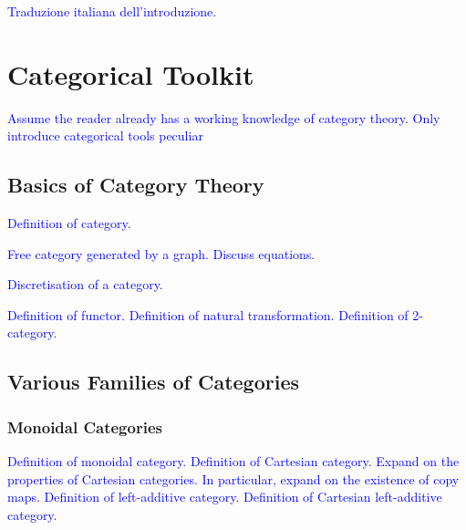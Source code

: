 \documentclass[11pt,a4paper,openright,twoside]{report}
\theoremstyle{plain}
\theoremstyle{definition}
\begin{document}
  \textcolor{blue}{Traduzione italiana dell'introduzione.}


\clearpage{\pagestyle{empty}\cleardoublepage}



\tableofcontents
\rhead[\fancyplain{}{\bfseries\leftmark}]{\fancyplain{}{\bfseries\thepage}} 
\clearpage{\pagestyle{empty}\cleardoublepage}





\chapter{Categorical Toolkit}
\lhead[\fancyplain{}{\bfseries\thepage}]{\fancyplain{}{\bfseries\rightmark}}



\textcolor{blue}{Assume the reader already has a working knowledge of category theory. Only introduce categorical tools peculiar }



\section{Basics of Category Theory}


\textcolor{blue}{Definition of category.}

\textcolor{blue}{Free category generated by a graph. Discuss equations.}

\textcolor{blue}{Discretisation of a category.}

\textcolor{blue}{Definition of functor.}
\textcolor{blue}{Definition of natural transformation.}
\textcolor{blue}{Definition of 2-category.}


\section{Various Families of Categories}

\subsection{Monoidal Categories}

\textcolor{blue}{Definition of monoidal category.}
\textcolor{blue}{Definition of Cartesian category.}
\textcolor{blue}{Expand on the properties of Cartesian categories. In particular, expand on the existence of copy maps.}
\textcolor{blue}{Definition of left-additive category.}
\textcolor{blue}{Definition of Cartesian left-additive category.}
\end{document}

